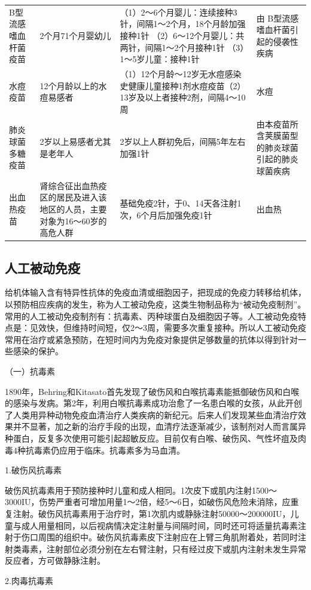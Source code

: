 \begin{longtable}[]{p{3cm}p{4cm}p{4cm}p{4cm}}
B型流感嗜血杆菌疫苗 & 2个月71个月婴幼儿 &（1）2～6个月婴儿：连续接种3针，间隔1～2个月，18个月龄加强接种1针 （2）6～12个月婴儿：共两针，间隔1～2个月接种1针 （3）1～5岁儿童：接种1针& 由 B型流感嗜血杆菌引起的侵袭性疾病\\
水痘疫苗 & 12个月龄以上的水痘易感者 &（1）12个月龄～12岁无水痘感染史健康儿童接种1剂水痘疫苗（2）13岁及以上者接种2剂，间隔4～10周& 水痘\\
肺炎球菌多糖疫苗 & 2岁以上易感者尤其是老年人 &
2岁以上人群初免后，间隔5年左右加强1针 &由本疫苗所含荚膜菌型的肺炎球菌引起的肺炎球菌疾病\\
出血热疫苗 &肾综合征出血热疫区的居民及进入该地区的人员，主要对象为16～60岁的高危人群& 基础免疫2针，于0、14天各注射1次，6个月后加强免疫1针 &出血热\\
\bottomrule
\end{longtable}


\subsection{人工被动免疫}

给机体输入含有特异性抗体的免疫血清或细胞因子，把现成的免疫力转移给机体，以预防相应疾病的发生，称为人工被动免疫，这类生物制品称为“被动免疫制剂”。常用的人工被动免疫制剂有：抗毒素、丙种球蛋白及细胞因子等。人工被动免疫特点是：见效快，但维持时间短，仅2～3周，需要多次重复接种。所以人工被动免疫常用在治疗或紧急预防，在短时间内为免疫对象提供足够数量的抗体以得到针对一些感染的保护。

（一）抗毒素

1890年，Behring和Kitasato首先发现了破伤风和白喉抗毒素能抵御破伤风和白喉的感染与发病。第2年，利用白喉抗毒素成功治愈了一名患白喉的女孩，从此开创了人类用异种动物免疫血清治疗人类疾病的新纪元。后来人们发现某些血清治疗效果并不显著，加之新的治疗手段的出现，血清疗法逐渐减少，该制剂对人而言属异种蛋白，反复多次使用可能引起超敏反应。目前仅有白喉、破伤风、气性坏疽及肉毒4种抗毒素仍应用于临床。抗毒素多为马血清。

1.破伤风抗毒素

破伤风抗毒素用于预防接种时儿童和成人相同。1次皮下或肌内注射1500～3000IU，伤势严重者可增加用量1～2倍，经5～6日，如破伤风危险未消除，应重复注射。破伤风抗毒素用于治疗时，第1次肌内或静脉注射50000～200000IU，儿童与成人用量相同，以后视病情决定注射量与间隔时间，同时还可将适量抗毒素注射于伤口周围的组织中。破伤风抗毒素皮下注射应在上臂三角肌附着处，若同时注射类毒素，注射部位必须分别在左右臂注射，只有经过皮下或肌内注射未发生异常反应者，方可做静脉注射。

2.肉毒抗毒素

